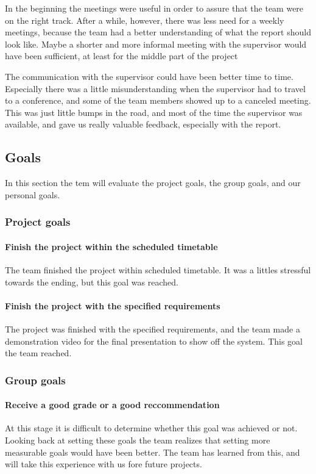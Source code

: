 In the beginning the meetings were useful in order to assure that the team were on the right
track. After a while, however, there was less need for a weekly meetings, because the team had a better understanding of what the report should look like.
Maybe a shorter and more informal meeting with the supervisor would have been sufficient, at least for the
middle part of the project 

The communication with the supervisor could have been better time to time. Especially there was a little misunderstanding when the supervisor had to travel to a conference, and some of the team members showed up to a canceled meeting. This was just little bumps in the road, and most of the time the supervisor was available, and gave us really valuable feedback, especially with the report. 

\subsection{Goals} 
In this section the tem will evaluate the project goals, the group goals, and our personal goals. 

\subsubsection{Project goals}
\paragraph{Finish the project within the scheduled timetable}
The team finished the project within scheduled timetable. It was a littles stressful towards the ending, but this goal was reached.
\paragraph{Finish the project with the specified requirements}
The project was finished with the specified requirements, and the team made a demonstration video for the final presentation to show off the system. This goal the team reached. 

\subsubsection{Group goals}
\paragraph{Receive a good grade or a good reccommendation}
At this stage it is difficult to determine whether this goal was achieved or not. Looking back at setting these goals the team realizes that setting more measurable goals would have been better. The team has learned from this, and will take this experience with us fore future projects.


